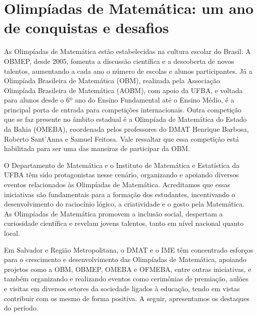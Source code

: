 \documentclass{hipatia}
\begin{document}




\section{Olimpíadas de Matemática: um ano de conquistas e desafios}

As Olimpíadas de Matemática estão estabelecidas na cultura escolar do Brasil. A OBMEP, desde 2005, fomenta a discussão científica e a descoberta de novos talentos, aumentando a cada ano o número de escolas e alunos participantes. Já a Olimpíada Brasileira de Matemática (OBM), realizada pela Associação Olimpíada Brasileira de Matemática (AOBM), com apoio da UFBA, e voltada para alunos desde o 6º ano do Ensino Fundamental até o Ensino Médio, é a principal porta de entrada para competições internacionais. Outra competição que se faz presente no âmbito estadual é a Olimpíada de Matemática do Estado da Bahia (OMEBA), coordenada pelos professores do DMAT Henrique Barbosa, Roberto Sant'Anna e Samuel Feitosa. Vale ressaltar que essa competição está habilitada para ser uma das maneiras de participar da OBM.

O Departamento de Matemática %
e o Instituto de Matemática e Estatística da UFBA %
têm sido protagonistas nesse cenário, organizando e apoiando diversos eventos relacionados às Olimpíadas de Matemática. Acreditamos que essas iniciativas são fundamentais para a formação dos estudantes, incentivando o desenvolvimento do raciocínio lógico, a criatividade e o gosto pela Matemática. As Olimpíadas de Matemática promovem a inclusão social, despertam a curiosidade científica e revelam jovens talentos, tanto em nível nacional quanto local.

Em Salvador e Região Metropolitana, o DMAT e o IME têm concentrado esforços para o crescimento e desenvolvimento das Olimpíadas de Matemática, apoiando projetos como a OBM, OBMEP, OMEBA e OFMEBA, entre outras iniciativas, e também organizando e realizando eventos como cerimônias de premiação, aulões e visitas em diversos setores da sociedade ligados à educação, tendo em vistas contribuir com os mesmo de forma positiva. A seguir, apresentamos os destaques do período.
\end{document}
